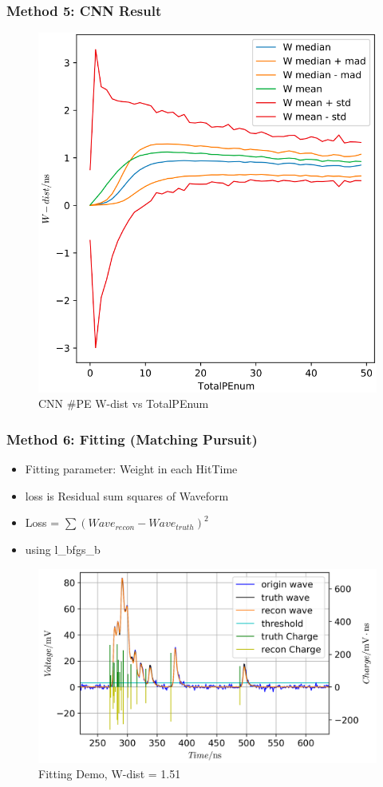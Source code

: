\documentclass{beamer}
\begin{document}
\begin{frame}
\frametitle{Method 5: CNN Result}
\setlength{\abovecaptionskip}{0mm}
\setlength{\belowcaptionskip}{0mm}
\begin{figure}
    \centering
    \caption{CNN \#PE W-dist vs TotalPEnum}
    \includegraphics[width=0.65\linewidth]{img/takarapenumstats.png}
\end{figure}
\end{frame}

\begin{frame}
\frametitle{Method 6: Fitting (Matching Pursuit)}
\begin{itemize}
    \item Fitting parameter: Weight in each HitTime
    \item loss is Residual sum squares of Waveform
    \item Loss = $\sum(Wave_{recon}-Wave_{truth})^{2}$
    \item using l\_bfgs\_b
\end{itemize}
\setlength{\abovecaptionskip}{0mm}
\setlength{\belowcaptionskip}{0mm}
\begin{figure}
    \centering
    \caption{Fitting Demo, W-dist = 1.51}
    \includegraphics[width=0.85\linewidth]{img/demo.png}
\end{figure}
\end{frame}
\end{document}

